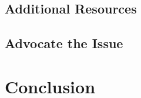 \documentclass[letterpaper, twoside, openright]{report}
\begin{document}
\subsection{Additional Resources}

\cite{gomez_alvarez-arenas_air-coupled_2003}

\subsection{Advocate the Issue}

 

\section{Conclusion}





\end{document}
